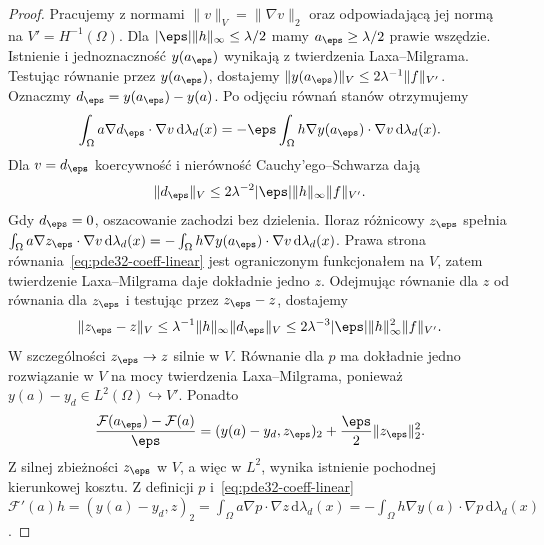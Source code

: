 \begin{proof}
Pracujemy z normami $\|v\|_V=\|\nabla v\|_2$
oraz odpowiadającą jej normą na $V'=H^{-1}(\Omega)$.
Dla $|\eps|\|h\|_\infty\le\lambda/2$ mamy
$a_\eps\ge\lambda/2$ prawie wszędzie.
Istnienie i jednoznaczność $y(a_\eps)$ wynikają
z twierdzenia Laxa--Milgrama.
Testując równanie przez $y(a_\eps)$, dostajemy
$\|y(a_\eps)\|_V\le2\lambda^{-1}\|f\|_{V'}$.
Oznaczmy $d_\eps=y(a_\eps)-y(a)$.
Po odjęciu równań stanów otrzymujemy
\[
 \int_\Omega a\nabla d_\eps\cdot\nabla v
 \,\mathrm d\lambda_d(x)
 =-\eps\int_\Omega h\nabla y(a_\eps)\cdot\nabla v
 \,\mathrm d\lambda_d(x).
\]
Dla $v=d_\eps$ koercywność i nierówność
Cauchy'ego--Schwarza dają
\[
 \|d_\eps\|_V
 \le 2\lambda^{-2}|\eps|\|h\|_\infty\|f\|_{V'}.
\]
Gdy $d_\eps=0$, oszacowanie zachodzi bez dzielenia.
Iloraz różnicowy $z_\eps$ spełnia
$\int_\Omega a\nabla z_\eps\cdot\nabla v\,\mathrm d\lambda_d(x)
=-\int_\Omega h\nabla y(a_\eps)\cdot\nabla v\,\mathrm d\lambda_d(x)$.
Prawa strona równania~\eqref{eq:pde32-coeff-linear}
jest ograniczonym funkcjonałem na $V$, zatem
twierdzenie Laxa--Milgrama daje dokładnie jedno $z$.
Odejmując równanie dla $z$ od równania dla
$z_\eps$ i testując przez $z_\eps-z$, dostajemy
\[
 \|z_\eps-z\|_V
 \le\lambda^{-1}\|h\|_\infty\|d_\eps\|_V
 \le2\lambda^{-3}|\eps|\|h\|_\infty^2\|f\|_{V'}.
\]
W szczególności $z_\eps\to z$ silnie w $V$.
Równanie dla $p$ ma dokładnie jedno rozwiązanie
w $V$ na mocy twierdzenia Laxa--Milgrama, ponieważ
$y(a)-y_d\in L^2(\Omega)\hookrightarrow V'$.
Ponadto
\[
 \frac{\mathcal F(a_\eps)-\mathcal F(a)}{\eps}
 =(y(a)-y_d,z_\eps)_2+\frac{\eps}{2}\|z_\eps\|_2^2.
\]
Z silnej zbieżności $z_\eps$ w $V$, a więc w $L^2$,
wynika istnienie pochodnej kierunkowej kosztu.
Z definicji $p$ i~\eqref{eq:pde32-coeff-linear}
$\mathcal F'(a)h=(y(a)-y_d,z)_2
=\int_\Omega a\nabla p\cdot\nabla z\,\mathrm d\lambda_d(x)
=-\int_\Omega h\nabla y(a)\cdot\nabla p\,\mathrm d\lambda_d(x)$.
\end{proof}


